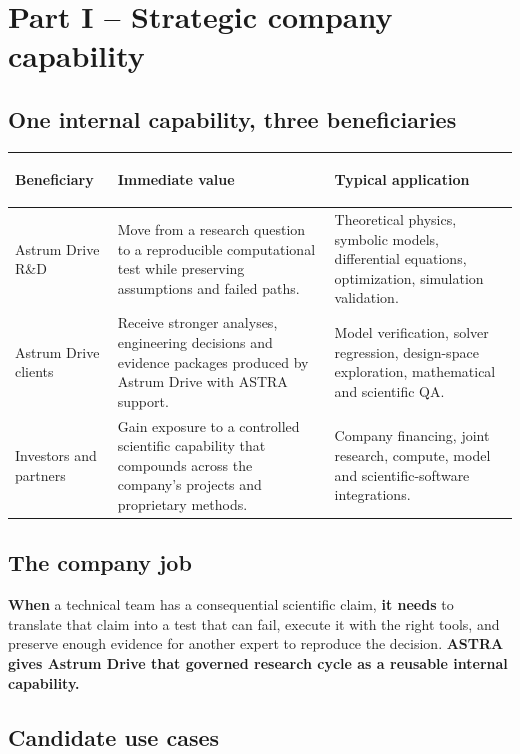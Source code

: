 \documentclass[10pt,a4paper]{article}
\begin{document}
\section*{Part I -- Strategic company capability}

\subsection*{One internal capability, three beneficiaries}

\begin{tabularx}{\textwidth}{@{}>{\bfseries\color{navy}\raggedright\arraybackslash}p{3.2cm} Y Y@{}}
\toprule
Beneficiary & Immediate value & Typical application \\
\midrule
Astrum Drive R\&D &
Move from a research question to a reproducible computational test while preserving assumptions and failed paths. &
Theoretical physics, symbolic models, differential equations, optimization, simulation validation. \\
\addlinespace
Astrum Drive clients &
Receive stronger analyses, engineering decisions and evidence packages produced by Astrum Drive with ASTRA support. &
Model verification, solver regression, design-space exploration, mathematical and scientific QA. \\
\addlinespace
Investors and partners &
Gain exposure to a controlled scientific capability that compounds across the company's projects and proprietary methods. &
Company financing, joint research, compute, model and scientific-software integrations. \\
\bottomrule
\end{tabularx}

\subsection*{The company job}

\begin{plainbox}
\textbf{When} a technical team has a consequential scientific claim, \textbf{it needs}
to translate that claim into a test that can fail, execute it with the right tools,
and preserve enough evidence for another expert to reproduce the decision.
\textbf{ASTRA gives Astrum Drive that governed research cycle as a reusable internal
capability.}
\end{plainbox}

\subsection*{Candidate use cases}
\end{document}
